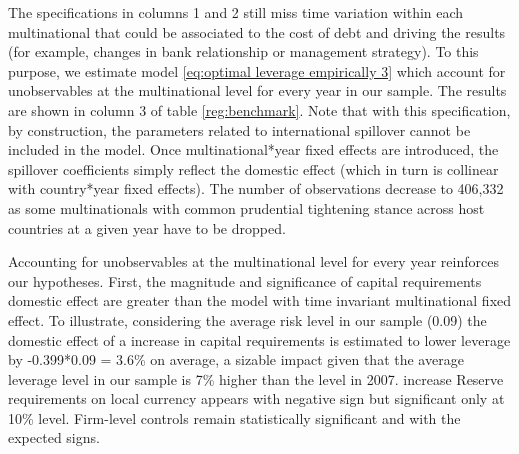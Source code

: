 \documentclass[12pt]{article}
\begin{document}
	  The specifications in columns 1 and 2 still miss time variation within each multinational that could be associated to the cost of debt and driving the results (for example, changes in bank relationship or management strategy). To this purpose, we estimate model \ref{eq:optimal leverage empirically 3} which account for unobservables at the multinational level for every year in our sample. The results are shown in column 3 of table \ref{reg:benchmark}. Note that with this specification, by construction, the parameters related to international spillover cannot be included in the model. Once multinational*year fixed effects are introduced, the spillover coefficients simply reflect the domestic effect (which in turn is collinear with country*year fixed effects). The number of observations decrease to 406,332 as some multinationals with common prudential tightening stance across host countries at a given year have to be dropped.
	  
	   Accounting for unobservables at the multinational level for every year reinforces our hypotheses. First, the magnitude and significance of capital requirements domestic effect are greater than the model with time invariant multinational fixed effect. To illustrate, considering the average risk level in our sample (0.09) the domestic effect of a increase in capital requirements is estimated to lower leverage by -0.399*0.09 = 3.6\% on average, a sizable impact given that the average leverage level in our sample is 7\% higher than the level in 2007. increase Reserve requirements on local currency appears with negative sign but significant only at 10\% level. Firm-level controls remain statistically significant and with the expected signs. 
	  
	
	
\end{document}
